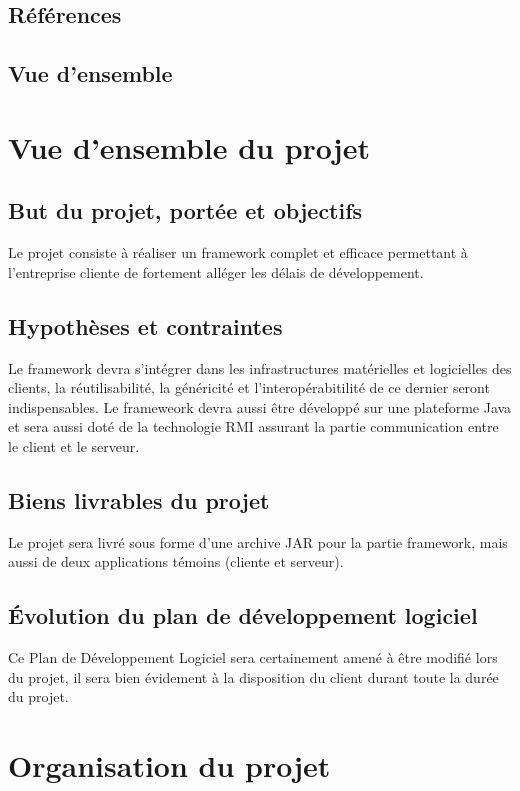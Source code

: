 \documentclass[a4paper,10pt,twoside]{article}
\begin{document}
\subsection{Références}
\subsection{Vue d’ensemble}

\section{Vue d’ensemble du projet}
\subsection{But du projet, portée et objectifs}
Le projet consiste à réaliser un framework complet et efficace permettant à l'entreprise cliente de fortement alléger les délais de développement.

\subsection{Hypothèses et contraintes}
Le framework devra s'intégrer dans les infrastructures matérielles et logicielles des clients, la réutilisabilité, la généricité et l'interopérabitilité de ce dernier seront indispensables.
Le frameweork devra aussi être développé sur une plateforme Java et sera aussi doté de la technologie RMI assurant la partie communication entre le client et le serveur.

\subsection{Biens livrables du projet}
Le projet sera livré sous forme d'une archive JAR pour la partie framework,
mais aussi de deux applications témoins (cliente et serveur).

\subsection{Évolution du plan de développement logiciel}
Ce Plan de Développement Logiciel sera certainement amené à être modifié lors du projet, il sera bien évidement à la disposition du client durant toute la durée du projet.

\section{Organisation du projet}
\end{document}
